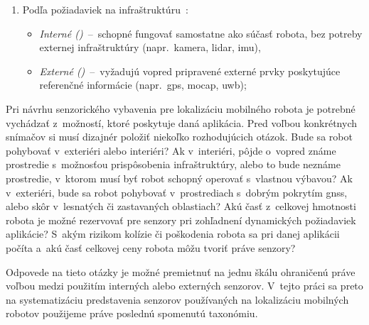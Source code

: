 \begin{enumerate}
  \item Podľa požiadaviek na infraštruktúru~\cite{ferreiraVehicleLocalizationSystem2013}:
  \begin{itemize}
    \item \emph{Interné ()}~--~schopné fungovať samostatne ako súčasť robota, bez potreby externej infraštruktúry (napr.\ kamera, \acrshort{lidar}, \acrshort{imu}),
    \item \emph{Externé ()}~--~vyžadujú vopred pripravené externé prvky poskytujúce referenčné informácie (napr.\ \acrshort{gps}, \acrshort{mocap}, \acrshort{uwb});
  \end{itemize}
  \end{enumerate}

  Pri návrhu senzorického vybavenia pre lokalizáciu mobilného robota je potrebné vychádzať z~možností, ktoré poskytuje daná aplikácia. Pred voľbou konkrétnych snímačov si musí dizajnér položiť niekoľko rozhodujúcich otázok. Bude sa robot pohybovať v~exteriéri alebo interiéri? Ak v~interiéri, pôjde o~vopred známe prostredie s~možnosťou prispôsobenia infraštruktúry, alebo to bude neznáme prostredie, v~ktorom musí byť robot schopný operovať s~vlastnou výbavou? Ak v~exteriéri, bude sa robot pohybovať v~prostrediach s~dobrým pokrytím \acrshort{gnss}, alebo skôr v~lesnatých či zastavaných oblastiach? Akú časť z~celkovej hmotnosti robota je možné rezervovať pre senzory pri zohľadnení dynamických požiadaviek aplikácie? S~akým rizikom kolízie či poškodenia robota sa pri danej aplikácii počíta a~akú časť celkovej ceny robota môžu tvoriť práve senzory?

  Odpovede na tieto otázky je možné premietnuť na jednu škálu ohraničenú práve voľbou medzi použitím interných alebo externých senzorov. V~tejto práci sa preto na systematizáciu predstavenia senzorov používaných na lokalizáciu mobilných robotov použijeme práve poslednú spomenutú taxonómiu.